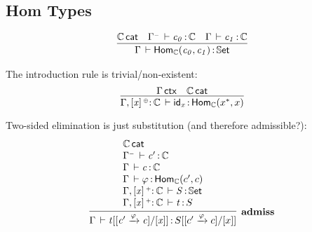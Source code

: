 \documentclass[11pt]{article}
\theoremstyle{plain}
\begin{document}
\subsection{Hom Types}
\[
\begin{array}{c}
\infer{\ofdtp{\Gamma}{\Hom{\C}{c_0}{c_1}}{\types}}
      {\wfdtp{\C} &
        \oftp{\Gamma^\con}{c_0}{\C} & 
        \oftp{\Gamma}{c_1}{\C} 
      }
\end{array}
\]

The introduction rule is trivial/non-existent:
\[
	\infer{
		\oftp{\Gamma, \twcatvar{x}{\coc}{\C}}{\idm x}{\Hom{\C}{x^*}{x}}
	}{
		\wfctx{\Gamma} & \wfdtp{\C}
	}
\]


Two-sided elimination is just substitution (and therefore admissible?):
\begin{equation}
	\infer[\admiss]{
		\oftp{\Gamma}{t[\substtw{c'}{c}{\vfi}{x}]}{S[\substtw{c'}{c}{\vfi}{x}]}
	}{ \begin{array}{l}
		\wfdtp{\C} \\
		\oftp{\Gamma^\con}{c'}{\C} \\
		\oftp{\Gamma}{c}{\C} \\
		\oftp{\Gamma}{\vfi}{\Hom{\C}{c'}{c}} \\
		\oftp{\Gamma, \twcatvar{x}{\co}{\C} }{S}{\types} \\
		\oftp{\Gamma, \twcatvar{x}{\co}{\C} }{t}{S}
	\end{array} }
\end{equation}
\end{document}
